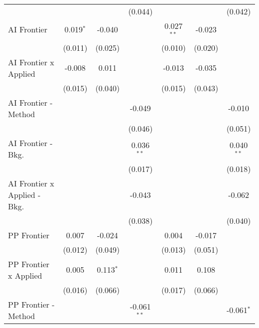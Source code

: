 \begin{tabular}{lcccccc}
                                  &             &               & (0.044)        &              &               & (0.042)\\   
   AI Frontier                    & 0.019$^{*}$ & -0.040        &                & 0.027$^{**}$ & -0.023        &   \\   
                                  & (0.011)     & (0.025)       &                & (0.010)      & (0.020)       &   \\   
   AI Frontier x Applied          & -0.008      & 0.011         &                & -0.013       & -0.035        &   \\   
                                  & (0.015)     & (0.040)       &                & (0.015)      & (0.043)       &   \\   
   AI Frontier - Method           &             &               & -0.049         &              &               & -0.010\\   
                                  &             &               & (0.046)        &              &               & (0.051)\\   
   AI Frontier - Bkg.             &             &               & 0.036$^{**}$   &              &               & 0.040$^{**}$\\   
                                  &             &               & (0.017)        &              &               & (0.018)\\   
   AI Frontier x Applied - Bkg.   &             &               & -0.043         &              &               & -0.062\\   
                                  &             &               & (0.038)        &              &               & (0.040)\\   
   PP Frontier                    & 0.007       & -0.024        &                & 0.004        & -0.017        &   \\   
                                  & (0.012)     & (0.049)       &                & (0.013)      & (0.051)       &   \\   
   PP Frontier x Applied          & 0.005       & 0.113$^{*}$   &                & 0.011        & 0.108         &   \\   
                                  & (0.016)     & (0.066)       &                & (0.017)      & (0.066)       &   \\   
   PP Frontier - Method           &             &               & -0.061$^{**}$  &              &               & -0.061$^{*}$\\   

\end{tabular}
